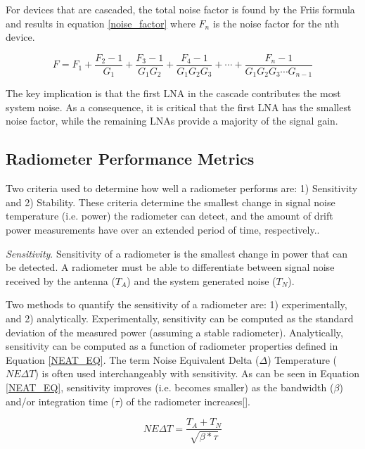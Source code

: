 For devices that are cascaded, the total noise factor is found by the Friis formula and results in equation \ref{noise_factor} where $F_n$ is the noise factor for the nth device.  

\begin{equation}\label{noise_factor}
F=F_1+\frac{F_2-1}{G_1}+\frac{F_3-1}{G_1 G_2}+\frac{F_4-1}{G_1 G_2 G_3}+\cdots +\frac{F_n-1}{G_1 G_2 G_3 \cdots G_{n-1}}
\end{equation}

The key implication is that the first LNA in the cascade contributes the most system noise.  As a consequence, it is critical that the first LNA has the smallest noise factor, while the remaining LNAs provide a majority of the signal gain.

\subsection{Radiometer Performance Metrics}\label{performance_metrics}

Two criteria used to determine how well a radiometer performs are: 1) Sensitivity and 2) Stability.  These criteria determine the smallest change in signal noise temperature (i.e. power) the radiometer can detect, and the amount of drift power measurements have over an extended period of time, respectively..

\emph{Sensitivity}.  Sensitivity of a radiometer is the smallest change in power that can be detected.  A radiometer must be able to differentiate between signal noise received by  the antenna ($T_{A}$) and the system generated noise ($T_N$).

Two methods to quantify the sensitivity of a radiometer are: 1) experimentally, and 2) analytically.  Experimentally, sensitivity can be computed as the standard deviation of the measured power (assuming a stable radiometer).  Analytically, sensitivity can be computed as a function of radiometer properties defined in Equation \ref{NEAT_EQ}.  The term Noise Equivalent Delta ($\Delta$) Temperature ($NE\Delta T$) is often used interchangeably with sensitivity.  As can be seen in Equation \ref{NEAT_EQ}, sensitivity improves (i.e. becomes smaller) as the bandwidth ($\beta$) and/or integration time ($\tau$) of the radiometer increases[\cite{ulaby}].

\begin{equation} \label{NEAT_EQ}
NE\Delta T=\frac{T_{A}+T_{N}}{\sqrt{\beta * \tau}} 
\end{equation}

